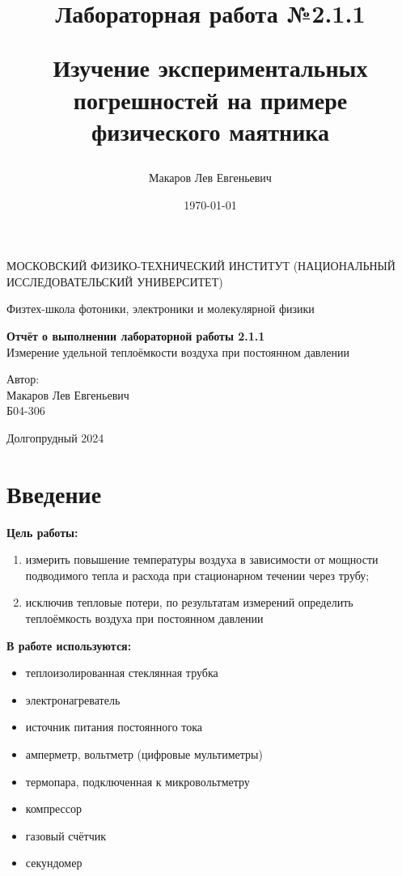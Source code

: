 \documentclass[a4paper,12pt]{article}
\author{Макаров Лев Евгеньевич}
\title{Лабораторная работа №2.1.1

Изучение экспериментальных погрешностей на примере физического маятника
}
\date{\today}
\begin{document}
\begin{titlepage}
	\begin{center}
		{\large МОСКОВСКИЙ ФИЗИКО-ТЕХНИЧЕСКИЙ ИНСТИТУТ (НАЦИОНАЛЬНЫЙ ИССЛЕДОВАТЕЛЬСКИЙ УНИВЕРСИТЕТ)}
	\end{center}
	\begin{center}
		{\large Физтех-школа фотоники, электроники и молекулярной физики}
	\end{center}
	
	
	\vspace{4.5cm}
	{\huge
		\begin{center}
			{\bf Отчёт о выполнении лабораторной работы 2.1.1}\\
			Измерение удельной теплоёмкости воздуха при постоянном давлении
		\end{center}
	}
	\vspace{2cm}
	\begin{flushright}
		{\LARGE Автор:\\ Макаров Лев Евгеньевич \\
			\vspace{0.2cm}
			Б04-306}
	\end{flushright}
	\vspace{8cm}
	\begin{center}
		Долгопрудный 2024
	\end{center}
\end{titlepage}

\section{Введение}

\textbf{Цель работы:} 
\begin{enumerate}
	\item измерить повышение температуры воздуха в зависимости от мощности подводимого тепла и расхода при стационарном течении через трубу;
    \item исключив тепловые потери, по результатам измерений определить теплоёмкость воздуха при постоянном давлении
\end{enumerate}

\textbf{В работе используются:} 
\begin{itemize}
    \item теплоизолированная стеклянная трубка
    \item электронагреватель
    \item источник питания постоянного тока
    \item амперметр, вольтметр (цифровые мультиметры) 
    \item термопара, подключенная к микровольтметру
    \item компрессор
    \item газовый счётчик
    \item секундомер
\end{itemize}
\medskip
\end{document}
